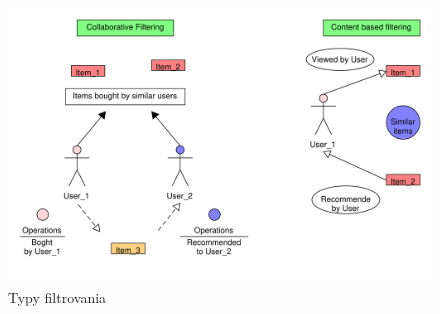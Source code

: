 \documentclass[10pt,slovak,a4paper]{article}
\begin{document}
\begin{figure}[h!]
  \centering
  \label{Types:of:filtering}
  \includegraphics[width=1\textwidth]{Images_tables/Filtering_pdf.pdf}
  \caption{Typy filtrovania}
\end{figure}
\end{document}
